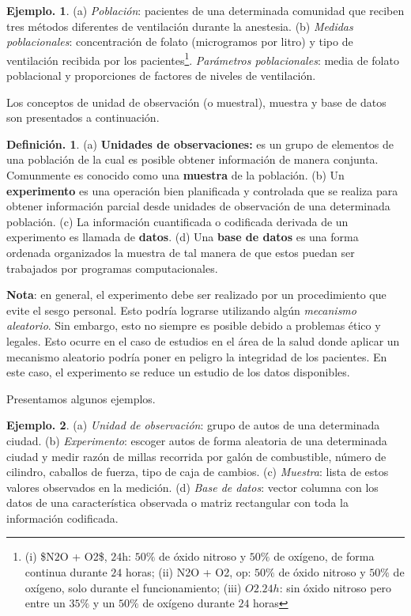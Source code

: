 \documentclass[]{book}
\theoremstyle{definition}
\newtheorem{definition}{Definición.}[chapter]
\theoremstyle{definition}
\newtheorem{example}{Ejemplo.}[chapter]
\theoremstyle{definition}
\theoremstyle{remark}
\begin{document}
\begin{example}
\protect\hypertarget{exm:unnamed-chunk-10}{}{\label{exm:unnamed-chunk-10} }(a) \emph{Población}: pacientes de una determinada
comunidad
que reciben tres métodos diferentes de
ventilación durante la anestesia. (b) \emph{Medidas
poblacionales}: concentración de folato
(microgramos por litro) y tipo de ventilación
recibida
por los pacientes\footnote{(i) \$\mbox{N$2$O} +
  \mbox{O}2\$, \(24\)h: \(50\%\) de óxido nitroso y
  \(50\%\) de
  oxígeno, de forma continua durante \(24\)
  horas; (ii) N2O + O2, op: \(50\%\) de óxido nitroso
  y
  \(50\%\) de oxígeno, solo durante el
  funcionamiento; (iii) \(O2.24h\): sin óxido nitroso
  pero
  entre un \(35\%\) y un \(50\%\) de oxígeno
  durante \(24\) horas}. \emph{Parámetros poblacionales}:
media
de folato poblacional y proporciones de
factores de niveles de ventilación.
\end{example}

Los conceptos de unidad de observación (o
muestral),
muestra y base de datos son presentados a
continuación.

\begin{definition}
\protect\hypertarget{def:unnamed-chunk-11}{}{\label{def:unnamed-chunk-11} }(a) \textbf{Unidades de observaciones:} es un grupo de
elementos de una población de la cual es
posible obtener información de manera conjunta.
Comunmente es
conocido como una \textbf{muestra} de la población. (b)
Un
\textbf{experimento} es una operación bien
planificada y controlada que se realiza para
obtener
información parcial desde unidades de
observación de una determinada población. (c) La
información cuantificada o codificada derivada de
un experimento es llamada de \textbf{datos}. (d)
Una \textbf{base de datos} es una forma ordenada
organizados la muestra de tal manera de que estos
puedan
ser trabajados por programas
computacionales.
\end{definition}

\textbf{Nota}: en general, el experimento debe ser
realizado
por un procedimiento que evite el sesgo
personal. Esto podría lograrse utilizando algún
\emph{mecanismo aleatorio}. Sin embargo, esto no
siempre es posible debido a problemas ético y
legales.
Esto ocurre en el caso de estudios en el
área de la salud donde aplicar un mecanismo
aleatorio
podría poner en peligro la integridad de los
pacientes. En este caso, el experimento se reduce un
estudio de los datos disponibles.

Presentamos algunos ejemplos.

\begin{example}
\protect\hypertarget{exm:unnamed-chunk-12}{}{\label{exm:unnamed-chunk-12} }(a) \emph{Unidad de observación}: grupo de autos de una
determinada ciudad. (b) \emph{Experimento}: escoger
autos de forma aleatoria de una determinada ciudad y
medir razón de millas recorrida por galón de
combustible, número de cilindro, caballos de fuerza, tipo
de caja de cambios. (c) \emph{Muestra}: lista de estos valores
observados en la medición. (d) \emph{Base de datos}: vector
columna con los datos de
una característica observada o matriz rectangular con
toda la información codificada.
\end{example}
\end{document}
